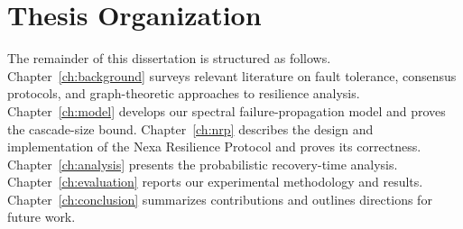 \section{Thesis Organization}

The remainder of this dissertation is structured as follows. Chapter~\ref{ch:background} surveys relevant literature on fault tolerance, consensus protocols, and graph-theoretic approaches to resilience analysis. Chapter~\ref{ch:model} develops our spectral failure-propagation model and proves the cascade-size bound. Chapter~\ref{ch:nrp} describes the design and implementation of the Nexa Resilience Protocol and proves its correctness. Chapter~\ref{ch:analysis} presents the probabilistic recovery-time analysis. Chapter~\ref{ch:evaluation} reports our experimental methodology and results. Chapter~\ref{ch:conclusion} summarizes contributions and outlines directions for future work.
